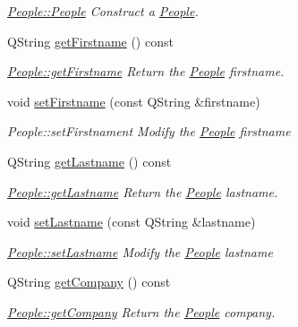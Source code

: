 \begin{DoxyCompactItemize}
\begin{DoxyCompactList}\small\item\em \hyperlink{classModels_1_1People_acdd7ec9d2f9815aeb230ca450cbcdbe3}{People\-::\-People} Construct a \hyperlink{classModels_1_1People}{People}. \end{DoxyCompactList}\item 
Q\-String \hyperlink{classModels_1_1People_ae7f110985bb461d8be359a135ec3bc48}{get\-Firstname} () const 
\begin{DoxyCompactList}\small\item\em \hyperlink{classModels_1_1People_ae7f110985bb461d8be359a135ec3bc48}{People\-::get\-Firstname} Return the \hyperlink{classModels_1_1People}{People} firstname. \end{DoxyCompactList}\item 
void \hyperlink{classModels_1_1People_a0bc1380b8c4bb29f59b09300edd1f354}{set\-Firstname} (const Q\-String \&firstname)
\begin{DoxyCompactList}\small\item\em People\-::set\-Firstnament Modify the \hyperlink{classModels_1_1People}{People} {\itshape firstname} \end{DoxyCompactList}\item 
Q\-String \hyperlink{classModels_1_1People_ae3e0992f5711b054a10bc50d8965be3c}{get\-Lastname} () const 
\begin{DoxyCompactList}\small\item\em \hyperlink{classModels_1_1People_ae3e0992f5711b054a10bc50d8965be3c}{People\-::get\-Lastname} Return the \hyperlink{classModels_1_1People}{People} lastname. \end{DoxyCompactList}\item 
void \hyperlink{classModels_1_1People_a550545199147a9947e5c66f9c154bf52}{set\-Lastname} (const Q\-String \&lastname)
\begin{DoxyCompactList}\small\item\em \hyperlink{classModels_1_1People_a550545199147a9947e5c66f9c154bf52}{People\-::set\-Lastname} Modify the \hyperlink{classModels_1_1People}{People} {\itshape lastname} \end{DoxyCompactList}\item 
Q\-String \hyperlink{classModels_1_1People_af4d0cf50ce941c262717b6f10b9d4b89}{get\-Company} () const 
\begin{DoxyCompactList}\small\item\em \hyperlink{classModels_1_1People_af4d0cf50ce941c262717b6f10b9d4b89}{People\-::get\-Company} Return the \hyperlink{classModels_1_1People}{People} company. \end{DoxyCompactList}\item 

\end{DoxyCompactItemize}
